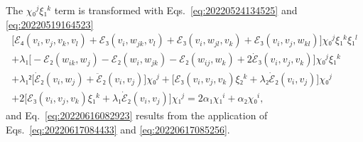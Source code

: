\documentclass[12pt, final]{scrartcl}
\theoremstyle{definition}
\begin{document}
The \(χ₀^j ξ₁^k\) term is transformed with Eqs.~\eqref{eq:20220524134525} and
\eqref{eq:20220519164523}
\begin{multline*}
  \bigl[ ℰ₄(v_i, v_j,  v_k, v_l) + ℰ₃(v_i, w_{jk}, v_l) + ℰ₃(v_i, w_{jl}, v_k) + ℰ₃(v_i, v_j, w_{kl})\bigr] χ₀^j ξ₁^k ξ₁^l\\
  + λ₁ \bigl[ -ℰ₂(w_{ik},  w_j) - ℰ₂(w_i, w_{jk}) - ℰ₂(w_{ij}, w_k) + 2 \dot{ℰ}₃(v_i, v_j,  v_k) \bigr] χ₀^j ξ₁^k\\
  + λ₁² \bigl[\dot{ℰ}₂(v_i, w_j) + \ddot{ℰ}₂(v_i, v_j)\bigr] χ₀^j + \bigl[ℰ₃(v_i, v_j, v_k) ξ₂^k + λ₂ \dot{ℰ}₂(v_i, v_j)\bigr] χ₀^j \\
  +2\bigl[ℰ₃(v_i, v_j,  v_k)  ξ₁^k + λ₁ \dot{ℰ}₂(v_i, v_j)\bigr] χ₁^j = 2α₁χ₁^i + α₂ χ₀^i,
\end{multline*}
and Eq.~\eqref{eq:20220616082923} results from the application of
Eqs.~\eqref{eq:20220617084433} and \eqref{eq:20220617085256}.
\end{document}
